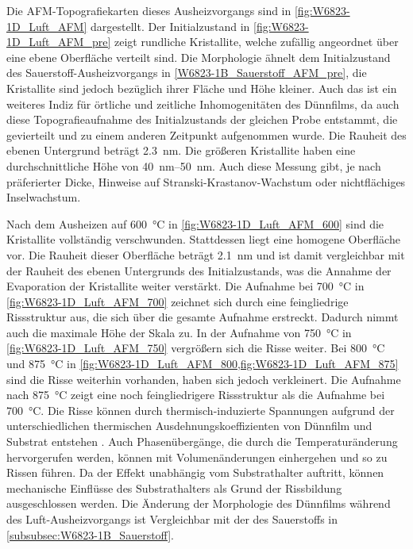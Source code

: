Die AFM-Topografiekarten dieses Ausheizvorgangs sind in \cref{fig:W6823-1D_Luft_AFM} dargestellt.
Der Initialzustand in \cref{fig:W6823-1D_Luft_AFM_pre} zeigt rundliche Kristallite, welche zufällig angeordnet über eine
ebene Oberfläche verteilt sind.
Die Morphologie ähnelt dem Initialzustand des Sauerstoff-Ausheizvorgangs in \cref{W6823-1B_Sauerstoff_AFM_pre},
die Kristallite sind jedoch bezüglich ihrer Fläche und Höhe kleiner.
Auch das ist ein weiteres Indiz für örtliche und zeitliche Inhomogenitäten des Dünnfilms, da auch diese
Topografieaufnahme des Initialzustands der gleichen Probe entstammt, die gevierteilt und zu einem
anderen Zeitpunkt aufgenommen wurde.
Die Rauheit des ebenen Untergrund beträgt \qty{2.3}{\nano\meter}.
Die größeren Kristallite haben eine durchschnittliche Höhe von \qtyrange{40}{50}{\nano\meter}.
Auch diese Messung gibt, je nach präferierter Dicke, Hinweise auf Stranski-Krastanov-Wachstum oder
nichtflächiges Inselwachstum.

Nach dem Ausheizen auf \qty{600}{\degreeCelsius} in \cref{fig:W6823-1D_Luft_AFM_600} sind die Kristallite vollständig
verschwunden.
Stattdessen liegt eine homogene Oberfläche vor.
Die Rauheit dieser Oberfläche beträgt \qty{2.1}{\nano\meter} und ist damit
vergleichbar mit der Rauheit des ebenen Untergrunds des Initialzustands, was die Annahme der Evaporation der Kristallite
weiter verstärkt.
Die Aufnahme bei \qty{700}{\degreeCelsius} in \cref{fig:W6823-1D_Luft_AFM_700} zeichnet sich durch eine feingliedrige
Rissstruktur aus, die sich über die gesamte Aufnahme erstreckt.
Dadurch nimmt auch die maximale Höhe der Skala zu.
In der Aufnahme von \qty{750}{\degreeCelsius} in \cref{fig:W6823-1D_Luft_AFM_750} vergrößern sich die Risse weiter.
Bei \qty{800}{\degreeCelsius} und \qty{875}{\degreeCelsius} in
\cref{fig:W6823-1D_Luft_AFM_800,fig:W6823-1D_Luft_AFM_875} sind die Risse weiterhin vorhanden, haben sich jedoch
verkleinert.
Die Aufnahme nach \qty{875}{\degreeCelsius} zeigt eine noch feingliedrigere Rissstruktur als die Aufnahme
bei \qty{700}{\degreeCelsius}.
Die Risse können durch thermisch-induzierte Spannungen aufgrund der unterschiedlichen thermischen
Ausdehnungskoeffizienten von Dünnfilm und Substrat entstehen \autocite{cracks}.
Auch Phasenübergänge, die durch die Temperaturänderung hervorgerufen werden, können mit Volumenänderungen
einhergehen und so zu Rissen führen.
Da der Effekt unabhängig vom Substrathalter auftritt, können mechanische Einflüsse des Substrathalters als Grund
der Rissbildung ausgeschlossen werden.
Die Änderung der Morphologie des Dünnfilms während des Luft-Ausheizvorgangs ist Vergleichbar mit der des Sauerstoffs
in \cref{subsubsec:W6823-1B_Sauerstoff}.

